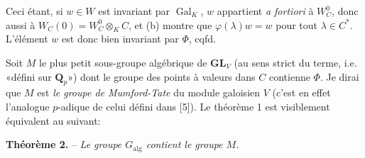 Ceci étant, si $w\in W$ est invariant par $\operatorname{Gal}_K$, $w$ appartient \textit{a fortiori} à $W_C^0$, donc aussi à $W_C(0)=W_C^0\otimes_K C$, et (b) montre que $\varphi(\lambda)w=w$ pour tout $\lambda\in C^*$. L'élément $w$ est donc bien invariant par $\Phi$, cqfd.

Soit $M$ le plus petit sous-groupe algébrique de $\mathbf{GL}_V$ (au sens strict du terme, i.e. «défini sur $\mathbf Q_p$») dont le groupe des points à valeurs dans $C$ contienne $\Phi$. Je dirai que $M$ est \textit{le groupe de Mumford-Tate} du module galoisien $V$ (c'est en effet l'analogue $p$-adique de celui défini dans [5]). Le théorème 1 est visiblement équivalent au suivant:

\textbf{Théorème 2.} -- \textit{Le groupe $G_{\mathrm{alg}}$ contient le groupe $M$.}
